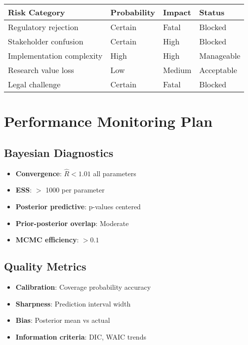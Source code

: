 \begin{center}
\begin{tabular}{llll}
\toprule
Risk Category & Probability & Impact & Status \\
\midrule
Regulatory rejection & Certain & Fatal & Blocked \\
Stakeholder confusion & Certain & High & Blocked \\
Implementation complexity & High & High & Manageable \\
Research value loss & Low & Medium & Acceptable \\
Legal challenge & Certain & Fatal & Blocked \\
\bottomrule
\end{tabular}
\end{center}

\section{Performance Monitoring Plan}

\subsection{Bayesian Diagnostics}

\begin{itemize}
    \item \textbf{Convergence}: $\hat{R} < 1.01$ all parameters
    \item \textbf{ESS}: $>$ 1000 per parameter
    \item \textbf{Posterior predictive}: p-values centered
    \item \textbf{Prior-posterior overlap}: Moderate
    \item \textbf{MCMC efficiency}: $> 0.1$
\end{itemize}

\subsection{Quality Metrics}

\begin{itemize}
    \item \textbf{Calibration}: Coverage probability accuracy
    \item \textbf{Sharpness}: Prediction interval width
    \item \textbf{Bias}: Posterior mean vs actual
    \item \textbf{Information criteria}: DIC, WAIC trends
\end{itemize}

